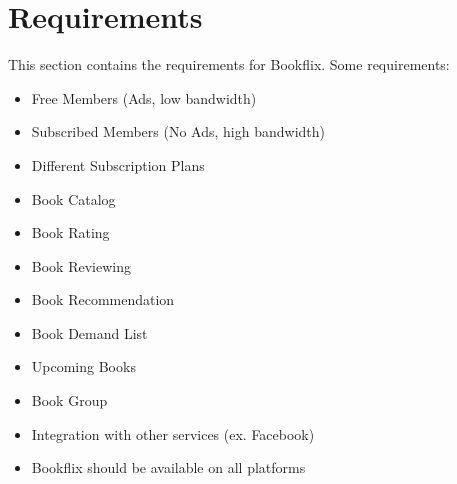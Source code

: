\chapter*{Requirements}
This section contains the requirements for Bookflix. Some requirements:
\begin{itemize}

\item Free Members (Ads, low bandwidth)
\item Subscribed Members (No Ads, high bandwidth)
\item Different Subscription Plans
\item Book Catalog
\item Book Rating
\item Book Reviewing
\item Book Recommendation 
\item Book Demand List
\item Upcoming Books
\item Book Group
\item Integration with other services (ex. Facebook)

\item Bookflix should be available on all platforms
\end{itemize}

